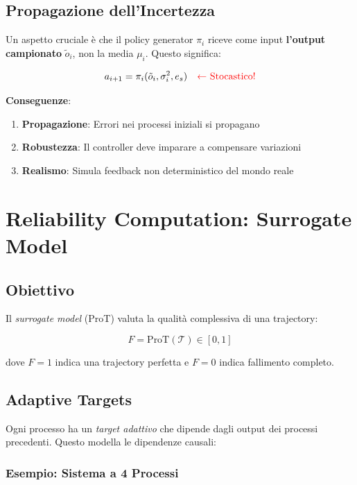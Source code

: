 \documentclass[11pt,a4paper]{article}
\begin{document}
\subsection{Propagazione dell'Incertezza}

Un aspetto cruciale è che il policy generator $\pi_i$ riceve come input \textbf{l'output campionato} $\tilde{o}_i$, non la media $\mu_i$. Questo significa:

\begin{equation}
a_{i+1} = \pi_i(\tilde{o}_i, \sigma_i^2, e_s) \quad \text{\textcolor{red}{← Stocastico!}}
\end{equation}

\textbf{Conseguenze}:
\begin{enumerate}
    \item \textbf{Propagazione}: Errori nei processi iniziali si propagano
    \item \textbf{Robustezza}: Il controller deve imparare a compensare variazioni
    \item \textbf{Realismo}: Simula feedback non deterministico del mondo reale
\end{enumerate}

\section{Reliability Computation: Surrogate Model}

\subsection{Obiettivo}

Il \textit{surrogate model} (ProT) valuta la qualità complessiva di una trajectory:

\begin{equation}
F = \text{ProT}(\mathcal{T}) \in [0, 1]
\end{equation}

dove $F = 1$ indica una trajectory perfetta e $F = 0$ indica fallimento completo.

\subsection{Adaptive Targets}

Ogni processo ha un \textit{target adattivo} che dipende dagli output dei processi precedenti. Questo modella le dipendenze causali:

\subsubsection{Esempio: Sistema a 4 Processi}
\end{document}
